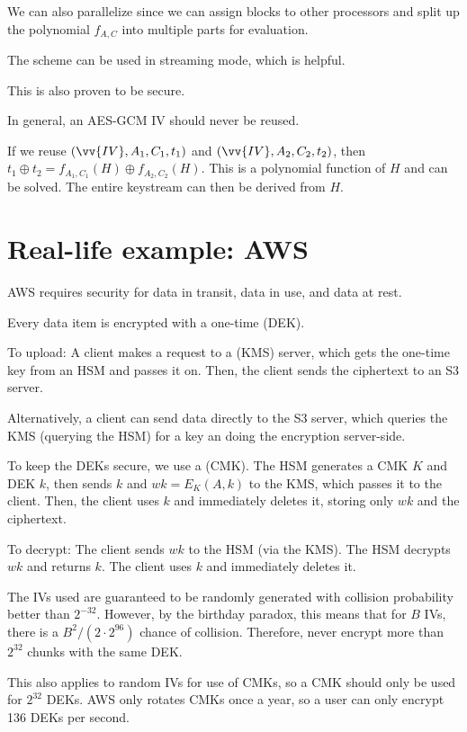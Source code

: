 \documentclass[class=co487,tikz,minted,notes]{agony}
\begin{document}
We can also parallelize since we can assign blocks to other processors
and split up the polynomial $f_{A,C}$ into multiple parts for evaluation.

The scheme can be used in streaming mode, which is helpful.

This is also proven to be secure.

In general, an AES-GCM IV should never be reused.

If we reuse $(\vv{IV}, A_1, C_1, t_1)$ and $(\vv{IV}, A_2, C_2, t_2)$,
then $t_1 \oplus t_2 = f_{A_1,C_1}(H) \oplus f_{A_2,C_2}(H)$.
This is a polynomial function of $H$ and can be solved.
The entire keystream can then be derived from $H$.

\section{Real-life example: AWS}
AWS requires security for data in transit, data in use, and data at rest.

Every data item is encrypted with a one-time  (DEK).

To upload: A client makes a request to a  (KMS) server,
which gets the one-time key from an HSM and passes it on.
Then, the client sends the ciphertext to an S3 server.

Alternatively, a client can send data directly to the S3 server,
which queries the KMS (querying the HSM) for a key an doing the encryption server-side.

To keep the DEKs secure, we use a  (CMK).
The HSM generates a CMK $K$ and DEK $k$,
then sends $k$ and $wk = E_K(A,k)$ to the KMS,
which passes it to the client.
Then, the client uses $k$ and immediately deletes it,
storing only $wk$ and the ciphertext.

To decrypt: The client sends $wk$ to the HSM (via the KMS).
The HSM decrypts $wk$ and returns $k$.
The client uses $k$ and immediately deletes it.

The IVs used are guaranteed to be randomly generated
with collision probability better than $2^{-32}$.
However, by the birthday paradox, this means that for $B$ IVs,
there is a $B^2/(2\cdot2^{96})$ chance of collision.
Therefore, never encrypt more than $2^{32}$ chunks with the same DEK.

This also applies to random IVs for use of CMKs,
so a CMK should only be used for $2^{32}$ DEKs.
AWS only rotates CMKs once a year,
so a user can only encrypt 136 DEKs per second.
\end{document}
